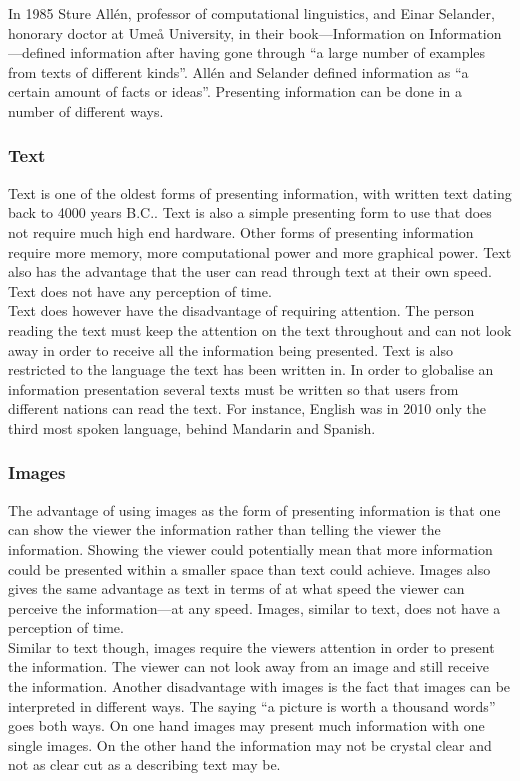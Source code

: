 In 1985 Sture All{\'e}n, professor of computational linguistics, and Einar Selander, honorary doctor at Ume{\aa} University, in their book---Information on Information---defined information after having gone through ``a large number of examples from texts of different kinds''. All{\'e}n and Selander defined information as ``a certain amount of facts or ideas''.\cite{informationDef1} Presenting information can be done in a number of different ways.

\subsubsection{Text}
Text is one of the oldest forms of presenting information, with written text dating back to 4000 years B.C..\cite{cuneiform} Text is also a simple presenting form to use that does not require much high end hardware. Other forms of presenting information require more memory, more computational power and more graphical power. Text also has the advantage that the user can read through text at their own speed. Text does not have any perception of time.\\

Text does however have the disadvantage of requiring attention. The person reading the text must keep the attention on the text throughout and can not look away in order to receive all the information being presented. Text is also restricted to the language the text has been written in. In order to globalise an information presentation several texts must be written so that users from different nations can read the text. For instance, English was in 2010 only the third most spoken language, behind Mandarin and Spanish.\cite{sprakNe}

\subsubsection{Images}
The advantage of using images as the form of presenting information is that one can show the viewer the information rather than telling the viewer the information. Showing the viewer could potentially mean that more information could be presented within a smaller space than text could achieve. Images also gives the same advantage as text in terms of at what speed the viewer can perceive the information---at any speed. Images, similar to text, does not have a perception of time.\\

Similar to text though, images require the viewers attention in order to present the information. The viewer can not look away from an image and still receive the information. Another disadvantage with images is the fact that images can be interpreted in different ways. The saying ``a picture is worth a thousand words'' goes both ways. On one hand images may present much information with one single images. On the other hand the information may not be crystal clear and not as clear cut as a describing text may be.\\


